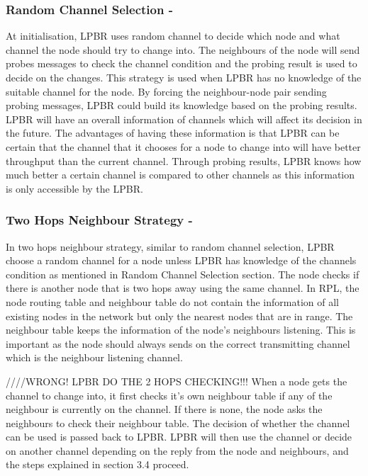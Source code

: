 \subsubsection{Random Channel Selection -}
At initialisation, LPBR uses random channel to decide which node and what channel the node should try to change into. The neighbours of the node will send probes messages to check the channel condition and the probing result is used to decide on the changes. This strategy is used when LPBR has no knowledge of the suitable channel for the node. By forcing the neighbour-node pair sending probing messages, LPBR could build its knowledge based on the probing results. LPBR will have an overall information of channels which will affect its decision in the future. The advantages of having these information is that LPBR can be certain that the channel that it chooses for a node to change into will have better throughput than the current channel. Through probing results, LPBR knows how much better a certain channel is compared to other channels as this information is only accessible by the LPBR. 
	
\subsubsection{Two Hops Neighbour Strategy -}
In two hops neighbour strategy, similar to random channel selection, LPBR choose a random channel for a node unless LPBR has knowledge of the channels condition as mentioned in Random Channel Selection section. The node checks if there is another node that is two hops away using the same channel. In RPL, the node routing table and neighbour table do not contain the information of all existing nodes in the network but only the nearest nodes that are in range. The neighbour table keeps the information of the node's neighbours listening. This is important as the node should always sends on the correct transmitting channel which is the neighbour listening channel. 

////WRONG! LPBR DO THE 2 HOPS CHECKING!!!
When a node gets the channel to change into, it first checks it's own neighbour table if any of the neighbour is currently on the channel. If there is none, the node asks the neighbours to check their neighbour table. The decision of whether the channel can be used is passed back to LPBR. LPBR will then use the channel or decide on another channel depending on the reply from the node and neighbours, and the steps explained in section 3.4 proceed. 

